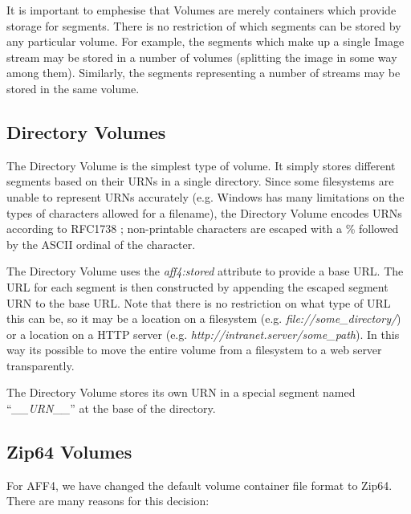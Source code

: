\documentclass[10pt, conference]{IEEEtran}
\begin{document}
It is important to emphesise that Volumes are merely containers which
provide storage for segments. There is no restriction of which
segments can be stored by any particular volume. For example, the
segments which make up a single Image stream may be stored in a number
of volumes (splitting the image in some way among them). Similarly,
the segments representing a number of streams may be stored in the
same volume.

\subsection{Directory Volumes}
The Directory Volume is the simplest type of volume. It simply stores
different segments based on their URNs in a single directory. Since
some filesystems are unable to represent URNs accurately (e.g. Windows
has many limitations on the types of characters allowed for a
filename), the Directory Volume encodes URNs according to RFC1738
\cite{RFC1738}; non-printable characters are escaped with a \%
followed by the ASCII ordinal of the character.

The Directory Volume uses the {\em aff4:stored} attribute to provide a
base URL. The URL for each segment is then constructed by appending
the escaped segment URN to the base URL. Note that there is no
restriction on what type of URL this can be, so it may be a location
on a filesystem (e.g. {\em file://some\_directory/}) or a location on a
HTTP server (e.g. {\em http://intranet.server/some\_path}). In this
way its possible to move the entire volume from a filesystem to a web
server transparently.

The Directory Volume stores its own URN in a special segment named
``{\em \_\_URN\_\_}'' at the base of the directory.

\subsection{Zip64 Volumes}
For AFF4, we have changed the default volume container file format to
Zip64\cite{zip-format}. There are many reasons for this decision:
\end{document}
